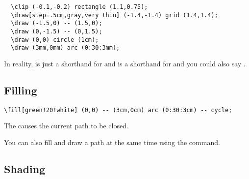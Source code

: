 
\begin{lstlisting}
  \clip (-0.1,-0.2) rectangle (1.1,0.75);
  \draw[step=.5cm,gray,very thin] (-1.4,-1.4) grid (1.4,1.4);
  \draw (-1.5,0) -- (1.5,0);
  \draw (0,-1.5) -- (0,1.5);
  \draw (0,0) circle (1cm);
  \draw (3mm,0mm) arc (0:30:3mm);  

\end{lstlisting}


In reality,  is just a shorthand for  and  is a shorthand for  and you could also say .



\subsection{Filling}
\label{sec:filling}

\begin{lstlisting}
\fill[green!20!white] (0,0) -- (3cm,0cm) arc (0:30:3cm) -- cycle;
\end{lstlisting}



The  causes the current path to be closed.


You can also fill and draw a path at the same time using the  command.


\subsection{Shading}
\label{sec:shading}

